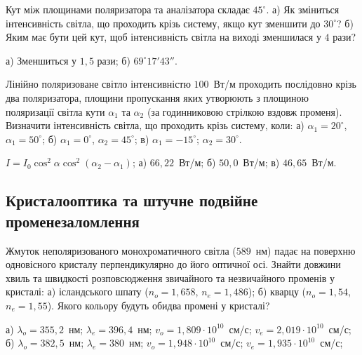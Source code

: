 \begin{problem}%
    Кут між площинами поляризатора та аналізатора складає $ 45^\circ $. а) Як
    зміниться інтенсивність світла, що проходить крізь систему, якщо кут
    зменшити до $ 30^\circ $? б) Яким має бути цей кут, щоб інтенсивність світла
    на виході зменшилася у $ 4 $ рази?
    \begin{solution}
        а) Зменшиться у $ 1,5 $ рази; б) $ 69^\circ17'43'' $.
    \end{solution}
\end{problem}


\begin{problem}%
    Лінійно поляризоване світло інтенсивністю $ 100 $~Вт/м проходить послідовно крізь два поляризатора, площини пропускання яких утворюють з площиною поляризації світла кути $ \alpha_1 $ та $ \alpha_2 $ (за годинниковою стрілкою вздовж променя). Визначити інтенсивність світла, що проходить крізь систему, коли: а) $ \alpha_1  =  20^\circ $, $ \alpha_1  =  50^\circ $; б) $ \alpha_1  = 0^\circ $,  $ \alpha_2  =  45^\circ $; в)  $ \alpha_1  =  -15^\circ $;  $ \alpha_2  =  30^\circ $.
    \begin{solution}
        $ I = I_0 \cos^2 \alpha \cos^2(\alpha_2 - \alpha_1) $; а) $ 66,22 $~Вт/м; б) $ 50,0 $~Вт/м; в) $ 46,65 $~Вт/м.
    \end{solution}
\end{problem}





\subsection*{Кристалооптика та штучне подвійне променезаломлення}




\begin{problem}%
    Жмуток неполяризованого монохроматичного світла ($ 589 $~нм) падає на поверхню одновісного кристалу перпендикулярно до його оптичної осі. Знайти довжини хвиль та швидкості розповсюдження звичайного та незвичайного променів у кристалі: а) ісландського шпату ($ n_o =1,658 $, $ n_e= 1,486 $); б) кварцу ($ n_o =1,54 $, $ n_e= 1,55 $). Якого кольору будуть обидва промені у кристалі?
    \begin{solution}
        а) $ \lambda_o = 355,2$~нм; $\lambda_e = 396,4 $~нм; $v_o = 1,809\cdot10^{10} $~см/с; $v_e = 2,019\cdot10^{10}$~см/с; б) $ \lambda_o = 382,5 $~нм; $\lambda_e = 380 $~нм; $v_o = 1,948\cdot10^{10} $~см/с; $v_e = 1,935\cdot10^{10}$~см/с;
    \end{solution}
\end{problem}


